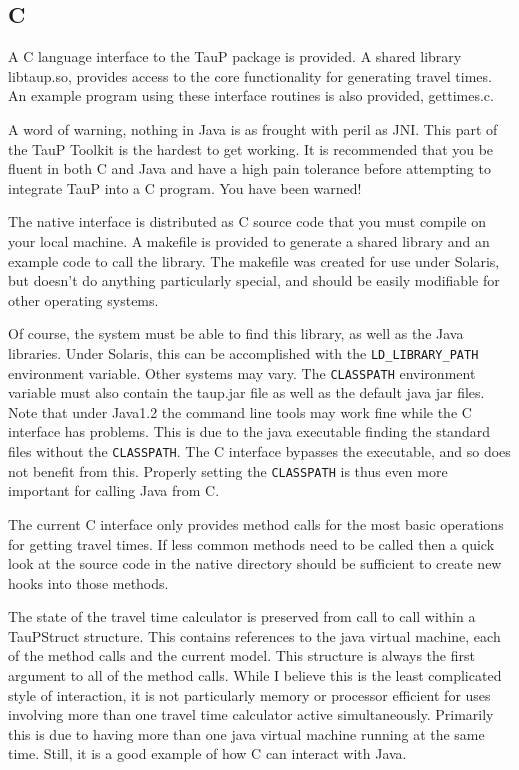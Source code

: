  
\subsection{C}
 
A C language interface to the TauP package is provided. A shared library
libtaup.so, provides access to the core functionality for generating travel 
times. An example program using these interface routines is also provided,
gettimes.c.

A word of warning, nothing in Java is as frought with peril as JNI. This part of the TauP Toolkit is the hardest to get working. It is recommended that you be
fluent in both C and Java and have a high pain tolerance before attempting to
integrate TauP into a C program. You have been warned!


The native interface is distributed as C source code that you must compile
on your local machine. A makefile is provided to generate a shared library
and an example code to call the library. The makefile was created for use under 
Solaris, but doesn't do anything particularly special, and should be
easily modifiable for other operating systems.

Of course, the system must be able to find this library, as well as the 
Java libraries. Under Solaris, this can be accomplished with the 
\texttt{LD\_LIBRARY\_PATH} environment variable. Other systems may vary.
The \texttt{CLASSPATH}  environment variable must also contain the taup.jar 
file as well as the default java jar files. Note that under Java1.2 the command
line tools may work fine while the C interface has problems. This is due to
the java executable finding the standard files without the \texttt{CLASSPATH}.
The C interface bypasses the executable, and so does not benefit from this.
Properly setting the \texttt{CLASSPATH} is thus even more important for calling
Java from C.

The current C interface only provides method calls for the most basic
operations for getting travel times. If less common methods need to be called
then a quick look at the source code in the native directory
should be sufficient to create new hooks into those methods.

The state of the travel time calculator is preserved from call to call within
a TauPStruct structure. This contains references to the java virtual machine,
each of the method calls and the current model. This structure is always
the first argument to all of the method calls. While I believe this is the
least complicated style of interaction, it is not particularly memory
or processor efficient for uses involving more than one travel time calculator
active simultaneously. Primarily this is due to having more than one
java virtual machine running at the same time. Still, it is a 
good example of how C can interact with Java.

